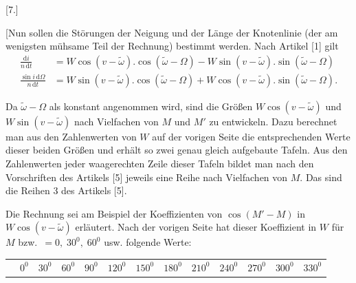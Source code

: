 \clearpage
\begin{landscape}
\begingroup
\fontsize{10}{13}\selectfont
{}
\renewcommand{\headrulewidth}{0pt}
\newcommand{\VSevenPoint}{\mathord{.}\mkern5mu}
\newcommand{\VSevenFivePoints}{\VSevenPoint\VSevenPoint\VSevenPoint\VSevenPoint\VSevenPoint}
\begin{center}[7.]\end{center}
\par\noindent\hspace*{\parindent}[Nun sollen die Störungen der Neigung und der Länge der Knotenlinie (der am wenigsten mühsame Teil der Rechnung) bestimmt werden. Nach Artikel [1] gilt
\[
\begin{aligned}
\frac{\mathrm{d}i}{n\,\mathrm{d}t}&=W\cos(v-\tilde\omega)\mathord{.}\cos(\tilde\omega-\Omega)-W\sin(v-\tilde\omega)\mathord{.}\sin(\tilde\omega-\Omega)\\
\frac{\sin i\,\mathrm{d}\Omega}{n\,\mathrm{d}t}&=W\sin(v-\tilde\omega)\mathord{.}\cos(\tilde\omega-\Omega)+W\cos(v-\tilde\omega)\mathord{.}\sin(\tilde\omega-\Omega).
\end{aligned}
\]
\par\noindent\hspace*{\parindent}Da \(\tilde\omega-\Omega\) als konstant angenommen wird, sind die Größen \(W\cos(v-\tilde\omega)\) und \(W\sin(v-\tilde\omega)\) nach Vielfachen von \(M\) und \(M'\) zu entwickeln. Dazu berechnet man aus den Zahlenwerten von \(W\) auf der vorigen Seite die entsprechenden Werte dieser beiden Größen und erhält so zwei genau gleich aufgebaute Tafeln. Aus den Zahlenwerten jeder waagerechten Zeile dieser Tafeln bildet man nach den Vorschriften des Artikels [5] jeweils eine Reihe nach Vielfachen von \(M\). Das sind die Reihen 3 des Artikels [5].
\par\noindent\hspace*{\parindent}Die Rechnung sei am Beispiel der Koeffizienten von \(\cos(M'-M)\) in \(W\cos(v-\tilde\omega)\) erläutert. Nach der vorigen Seite hat dieser Koeffizient in \(W\) für \(M\) bzw.\ \(=0,\;30^0,\;60^0\) usw. folgende Werte:
\begin{center}
\begingroup\fontsize{8.5}{11}\selectfont\setlength{\tabcolsep}{3pt}
\begin{tabular}{@{}l*{12}{r}@{}}
&\(0^0\)&\(30^0\)&\(60^0\)&\(90^0\)&\(120^0\)&\(150^0\)&\(180^0\)&\(210^0\)&\(240^0\)&\(270^0\)&\(300^0\)&\(330^0\)\\[4pt]

\end{tabular}
\end{center}
\end{landscape}
